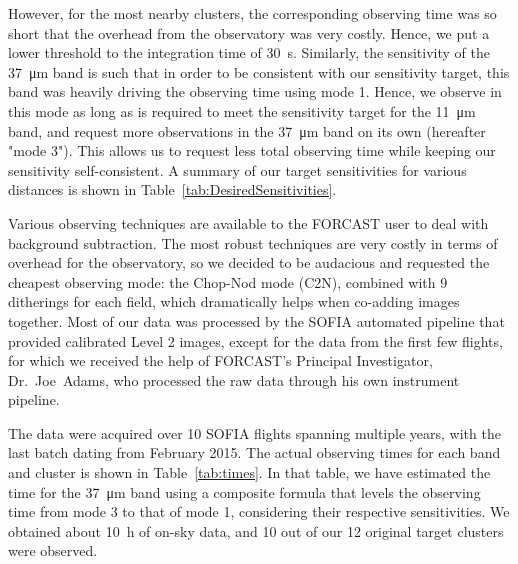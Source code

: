 However, for the most nearby clusters, the corresponding observing time was so short that the overhead from the observatory was very costly. Hence, we put a lower threshold to the integration time of \SI{30}{\second}. Similarly, the sensitivity of the \SI{37}{\um} band is such that in order to be consistent with our sensitivity target, this band was heavily driving the  observing time using mode 1. Hence, we observe in this mode as long as is required to meet the sensitivity target for the \SI{11}{\um} band, and request more observations in the \SI{37}{\um} band on its own (hereafter "mode 3"). This allows us to request less total observing time while keeping our sensitivity self-consistent. A summary of our target sensitivities for various distances is shown in Table~\ref{tab:DesiredSensitivities}.

Various observing techniques are available to the FORCAST user to deal with background subtraction. The most robust techniques are very costly in terms of overhead for the observatory, so we decided to be audacious and requested the cheapest observing mode: the Chop-Nod mode (C2N), combined with 9 ditherings for each field, which dramatically helps when co-adding images together. Most of our data was processed by the SOFIA automated pipeline that provided calibrated Level 2 images, except for the data from the first few flights, for which we received the help of FORCAST's Principal Investigator, Dr.~Joe~Adams, who processed the raw data through his own instrument pipeline.


The data were acquired over 10 SOFIA flights spanning multiple years, with the last batch dating from February 2015. The actual observing times for each band and cluster is shown in Table~\ref{tab:times}. In that table, we have estimated the time for the \SI{37}{\um} band using a composite formula that levels the observing time from mode 3 to that of mode 1, considering their respective sensitivities. We obtained about \SI{10}{\hour} of on-sky data, and 10 out of our 12 original target clusters were observed.

